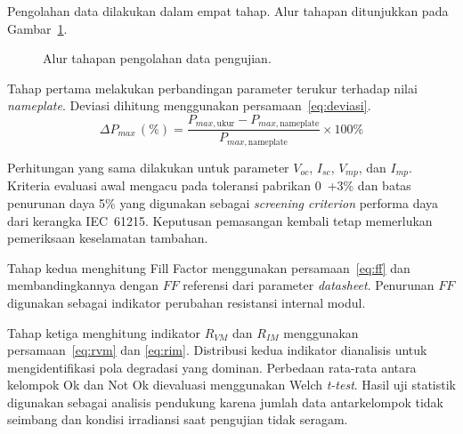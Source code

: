 Pengolahan data dilakukan dalam empat tahap. Alur tahapan ditunjukkan pada
Gambar~\ref{gbr:alur_analisis}.

\begin{figure}[H]
\centering
{}
\caption{Alur tahapan pengolahan data pengujian.}
\label{gbr:alur_analisis}
\end{figure}

Tahap pertama melakukan perbandingan parameter terukur terhadap nilai
\textit{nameplate}. Deviasi dihitung menggunakan
persamaan~\eqref{eq:deviasi}.
\begin{equation}
\Delta P_{max}\,(\%) =
\frac{P_{max,\text{ukur}} - P_{max,\text{nameplate}}}{P_{max,\text{nameplate}}}
\times 100\%
\label{eq:deviasi}
\end{equation}

Perhitungan yang sama dilakukan untuk parameter $V_{oc}$, $I_{sc}$, $V_{mp}$,
dan $I_{mp}$. Kriteria evaluasi awal mengacu pada toleransi pabrikan 0~+3\% dan
batas penurunan daya 5\% yang digunakan sebagai \textit{screening criterion}
performa daya dari kerangka IEC~61215. Keputusan pemasangan kembali tetap
memerlukan pemeriksaan keselamatan tambahan.

Tahap kedua menghitung Fill Factor menggunakan persamaan~\eqref{eq:ff} dan
membandingkannya dengan $FF$ referensi dari parameter \textit{datasheet}.
Penurunan $FF$ digunakan sebagai indikator perubahan resistansi internal modul.

Tahap ketiga menghitung indikator $R_{VM}$ dan $R_{IM}$ menggunakan
persamaan~\eqref{eq:rvm} dan \eqref{eq:rim}. Distribusi kedua indikator
dianalisis untuk mengidentifikasi pola degradasi yang dominan. Perbedaan
rata-rata antara kelompok Ok dan Not Ok dievaluasi menggunakan
Welch \textit{t-test}. Hasil uji statistik digunakan sebagai analisis pendukung
karena jumlah data antarkelompok tidak seimbang dan kondisi irradiansi saat
pengujian tidak seragam.

